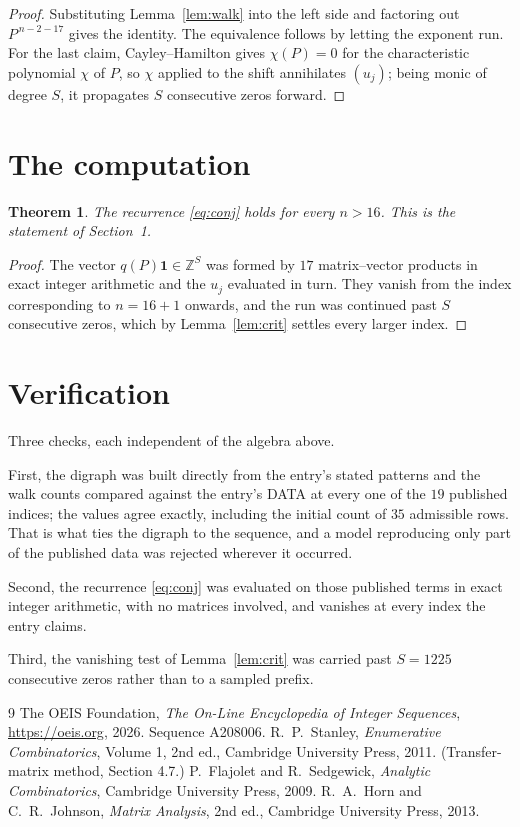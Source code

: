 \documentclass[11pt,a4paper]{article}
\theoremstyle{plain}
\newtheorem{theorem}{Theorem}
\theoremstyle{definition}
\begin{document}
\begin{proof}
Substituting Lemma~\ref{lem:walk} into the left side and factoring out
$P^{\,n-2-17}$ gives the identity. The equivalence follows by letting the exponent
run. For the last claim, Cayley--Hamilton gives $\chi(P)=0$ for the characteristic
polynomial $\chi$ of $P$, so $\chi$ applied to the shift annihilates $(u_j)$; being monic of
degree $S$, it propagates $S$ consecutive zeros forward.
\end{proof}

\section{The computation}

\begin{theorem}
The recurrence \eqref{eq:conj} holds for every $n>16$. This is the statement of
Section~1.
\end{theorem}

\begin{proof}
The vector $q(P)\mathbf{1}\in\mathbb{Z}^{S}$ was formed by $17$ matrix--vector
products in exact integer arithmetic and the $u_j$ evaluated in turn. They vanish from the
index corresponding to $n=16+1$ onwards, and the run was continued past $S$ consecutive
zeros, which by Lemma~\ref{lem:crit} settles every larger index.
\end{proof}

\section{Verification}

Three checks, each independent of the algebra above.

First, the digraph was built directly from the entry's stated patterns and the walk counts
compared against the entry's DATA at every one of the $19$ published indices; the
values agree exactly, including the initial count of $35$ admissible rows. That is
what ties the digraph to the sequence, and a model reproducing only part of the published
data was rejected wherever it occurred.

Second, the recurrence \eqref{eq:conj} was evaluated on those published terms in exact
integer arithmetic, with no matrices involved, and vanishes at every index the entry claims.

Third, the vanishing test of Lemma~\ref{lem:crit} was carried past $S=1225$ consecutive
zeros rather than to a sampled prefix.

\begin{thebibliography}{9}
 The OEIS Foundation, \emph{The On-Line Encyclopedia of Integer
Sequences}, \url{https://oeis.org}, 2026. Sequence A208006.
 R.~P.~Stanley, \emph{Enumerative Combinatorics}, Volume 1, 2nd ed.,
Cambridge University Press, 2011. (Transfer-matrix method, Section 4.7.)
 P.~Flajolet and R.~Sedgewick, \emph{Analytic Combinatorics}, Cambridge
University Press, 2009.
 R.~A.~Horn and C.~R.~Johnson, \emph{Matrix Analysis}, 2nd ed., Cambridge
University Press, 2013.
\end{thebibliography}
\end{document}
